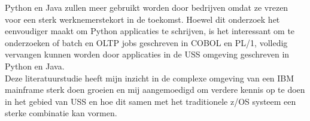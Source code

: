 Python en Java zullen meer gebruikt worden door bedrijven omdat ze vrezen voor een sterk werknemerstekort in de toekomst. Hoewel dit onderzoek het eenvoudiger maakt om Python applicaties te schrijven, is het interessant om te onderzoeken of batch en OLTP jobs geschreven in COBOL en PL/1, volledig vervangen kunnen worden door applicaties in de USS omgeving geschreven in Python en Java. \\

Deze literatuurstudie heeft mijn inzicht in de complexe omgeving van een IBM mainframe sterk doen groeien en mij aangemoedigd om verdere kennis op te doen in het gebied van USS en hoe dit samen met het traditionele z/OS systeem een sterke combinatie kan vormen.